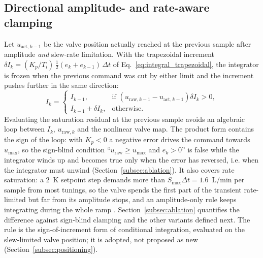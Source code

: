 \subsection{Directional amplitude- and rate-aware clamping}
\label{subsec:clamping_rule}
Let $u_{\text{act},k-1}$ be the valve position actually reached at the previous sample after amplitude \emph{and} slew-rate limitation. With the trapezoidal increment $\delta I_k = (K_p/T_i)\,\tfrac{1}{2}(e_k + e_{k-1})\,\Delta t$ of Eq.~\eqref{eq:integral_trapezoidal}, the integrator is frozen when the previous command was cut by either limit and the increment pushes further in the same direction:
\begin{equation}
    I_k = \begin{cases}
        I_{k-1}, & \text{if } \left(u_{\text{raw},k-1} - u_{\text{act},k-1}\right)\delta I_k > 0, \\
        I_{k-1} + \delta I_k, & \text{otherwise.}
    \end{cases}
    \label{eq:clamping_antiwindup}
\end{equation}
Evaluating the saturation residual at the previous sample avoids an algebraic loop between $I_k$, $u_{\text{raw},k}$ and the nonlinear valve map. The product form contains the sign of the loop: with $K_p < 0$ a negative error drives the command towards $u_{\max}$, so the sign-blind condition ``$u_{\text{raw}} \ge u_{\max}$ and $e_k > 0$'' is false while the integrator winds up and becomes true only when the error has reversed, i.e. when the integrator must unwind (Section~\ref{subsec:ablation}). It also covers rate saturation: a $2$~K setpoint step demands more than $S_{\max}\Delta t = 1.6$~L/min per sample from most tunings, so the valve spends the first part of the transient rate-limited but far from its amplitude stops, and an amplitude-only rule keeps integrating during the whole ramp \cite{bohn1995analysis, peng1996nonlinear}. Section~\ref{subsec:ablation} quantifies the difference against sign-blind clamping and the other variants defined next. The rule is the sign-of-increment form of conditional integration, evaluated on the slew-limited valve position; it is adopted, not proposed as new (Section~\ref{subsec:positioning}).


